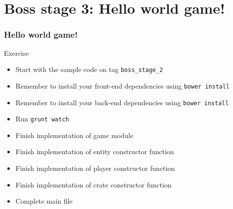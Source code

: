 \section{Boss stage 3: Hello world game!}

\begin{frame}[fragile]
\end{frame}

\begin{frame}[fragile]
  \frametitle{Hello world game!}

  \begin{block}{Exercise}
    \begin{itemize}
      \item Start with the sample code on tag \texttt{boss\_stage\_2}
      \item Remember to install your front-end dependencies using \texttt{bower install}
      \item Remember to install your back-end dependencies using \texttt{bower install}
      \item Run \texttt{grunt watch}
      \item Finish implementation of game module
      \item Finish implementation of entity constructor function
      \item Finish implementation of player constructor function
      \item Finish implementation of crate constructor function
      \item Complete main file
    \end{itemize}
  \end{block}
\end{frame}
